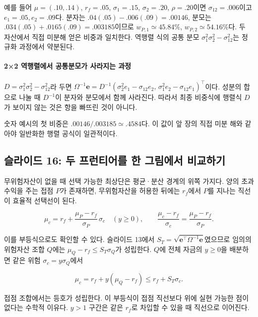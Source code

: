 \documentclass[11pt,a4paper]{article}
\begin{document}
예를 들어 $\mu=(.10,.14)$, $r_f=.05$, $\sigma_1=.15$, $\sigma_2=.20$, $\rho=.20$이면 $\sigma_{12}=.006$이고 $e_1=.05,e_2=.09$다. 분자는 $.04(.05)-.006(.09)=.00146$, 분모는 $.034(.05)+.0165(.09)=.003185$이므로 $w_{P,1}\simeq45.84\%$, $w_{P,2}\simeq54.16\%$다. 두 자산에서 직접 미분해 얻은 비중과 일치한다. 역행렬 식의 공통 분모 $\sigma_1^2\sigma_2^2-\sigma_{12}^2$는 정규화 과정에서 약분된다.
\par

\paragraph{2×2 역행렬에서 공통분모가 사라지는 과정}

$D=\sigma_1^2\sigma_2^2-\sigma_{12}^2$라 두면 $\Omega^{-1}\mathbf e=D^{-1}(\sigma_2^2e_1-\sigma_{12}e_2,\,\sigma_1^2e_2-\sigma_{12}e_1)^\top$이다. 성분의 합으로 나눌 때 $D^{-1}$이 분자와 분모에서 함께 사라진다. 따라서 최종 비중식에 행렬식 $D$가 보이지 않는 것은 항을 빠뜨린 것이 아니다.
\par

숫자 예시의 첫 비중은 $.00146/.003185\simeq.4584$다. 이 값이 앞 장의 직접 미분 해와 같아야 일반화한 행렬 공식이 일관적이다.
\par

\subsection{슬라이드 16: 두 프런티어를 한 그림에서 비교하기}

무위험자산이 없을 때 선택 가능한 최상단은 평균·분산 경계의 위쪽 가지다. 양의 초과수익을 주는 접점 $P$가 존재하면, 무위험자산을 허용한 뒤에는 $r_f$에서 $P$를 지나는 직선이 효율적 선택선이 된다.
\par

\[
\mu_c=r_f+\frac{\mu_P-r_f}{\sigma_P}\,\sigma_c
\quad(y\ge0),\qquad
\frac{\mu_c-r_f}{\sigma_c}=\frac{\mu_P-r_f}{\sigma_P}.
\]

이를 부등식으로도 확인할 수 있다. 슬라이드 13에서 $S_T=\sqrt{\mathbf e^\top\Omega^{-1}\mathbf e}$였으므로 임의의 위험자산 조합 $Q$에는 $\mu_Q-r_f\le S_T\sigma_Q$가 성립한다. $Q$에 전체 자금의 $y\ge0$을 배분하면 같은 위험 $\sigma_c=y\sigma_Q$에서
\par

\[
\mu_c=r_f+y(\mu_Q-r_f)\le r_f+S_T\sigma_c.
\]

접점 조합에서는 등호가 성립한다. 이 부등식이 접점 직선보다 위에 실현 가능한 점이 없다는 수학적 이유다. $y>1$ 구간은 같은 $r_f$로 차입할 수 있을 때 직선으로 이어진다.
\par
\end{document}
